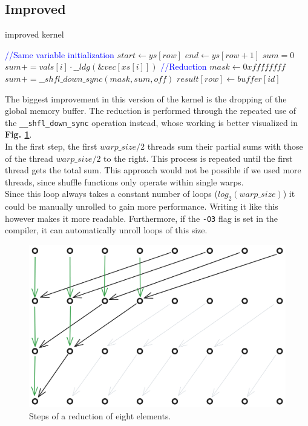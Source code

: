 \documentclass[conference]{IEEEtran}
\begin{document}
\subsection{Improved}
\begin{algorithm}[ht!]
    \caption{improved kernel}
    \begin{algorithmic}[1]
        \State \textcolor{blue}{//Same variable initialization}
         \Comment{\textcolor{blue}{Early return}}
        \State \Return
        \EndIf
        \State $start \gets ys[row]$
        \State $end \gets ys[row+1]$
        \State $sum = 0$
        \State $sum += vals[i] \cdot \_\_ldg(\&vec[xs[i]])$
        \EndFor
        \State \textcolor{blue}{//Reduction}
        \State $mask\gets0xffffffff$
        \State $sum += \_\_shfl\_down\_sync(mask, sum, off)$
        \EndFor
            \State $result[row] \gets buffer[id]$
        \EndIf
        \EndProcedure
    \end{algorithmic}
    \label{algo:improved}
\end{algorithm}
The biggest improvement in this version of the kernel is the dropping of the global memory buffer. The reduction is performed through the repeated use of the \texttt{\_\_shfl\_down\_sync} operation instead, whose working is better visualized in \textbf{Fig. \ref{fig:reduction}}.\\
In the first step, the first $warp\_size/2$ threads sum their partial sums with those of the thread $warp\_size/2$ to the right. This process is repeated until the first thread gets the total sum. This approach would not be possible if we used more threads, since shuffle functions only operate within single warps.\\
Since this loop always takes a constant number of loops ($log_2(warp\_size)$) it could be manually unrolled to gain more performance. Writing it like this however makes it more readable. Furthermore, if the \texttt{-O3} flag is set in the compiler, it can automatically unroll loops of this size.
\begin{figure}
    \centering
    \includegraphics[width=.5\linewidth]{images/reduction.png}
    \caption{Steps of a reduction of eight elements.}
    \label{fig:reduction}
\end{figure}
\end{document}
